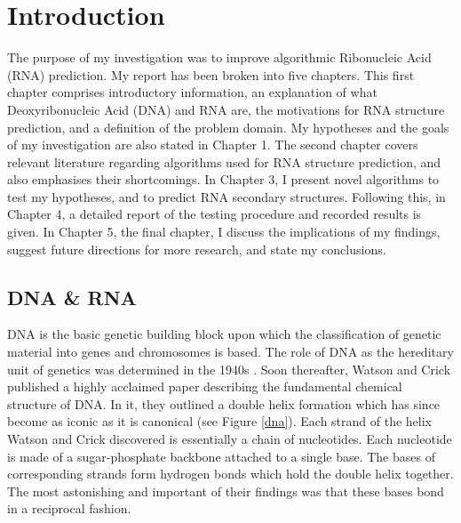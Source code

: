 \documentclass{cshonours}
\begin{document}
\tableofcontents
\listoftables  %
\listoffigures  %



\chapter{Introduction}
The purpose of my investigation was to improve algorithmic Ribonucleic Acid (RNA) prediction. My report has been broken into five chapters. This first chapter comprises introductory information, an explanation of what Deoxyribonucleic Acid (DNA) and RNA are, the motivations for RNA structure prediction, and a definition of the problem domain. My hypotheses and the goals of my investigation are also stated in Chapter 1. The second chapter covers relevant literature regarding algorithms used for RNA structure prediction, and also emphasises their shortcomings. In Chapter 3, I present novel algorithms to test my hypotheses, and to predict RNA secondary structures. Following this, in Chapter 4, a detailed report of the testing procedure and recorded results is given. In Chapter 5, the final chapter, I discuss the implications of my findings, suggest future directions for more research, and state my conclusions.

\section{DNA \& RNA}
DNA is the basic genetic building block upon which the classification of genetic material into genes and chromosomes is based. The role of DNA as the hereditary unit of genetics was determined in the 1940s \cite{albertsessential}. Soon thereafter, Watson and Crick \cite{watson1953molecular} published a highly acclaimed paper describing the fundamental chemical structure of DNA. In it, they outlined a double helix formation which has since become as iconic as it is canonical (see Figure \ref{dna}). Each strand of the helix Watson and Crick discovered is essentially a chain of nucleotides. Each nucleotide is made of a sugar-phosphate backbone attached to a single base. The bases of corresponding strands form hydrogen bonds which hold the double helix together. The most astonishing and important of their findings was that these bases bond in a reciprocal fashion.
\end{document}
